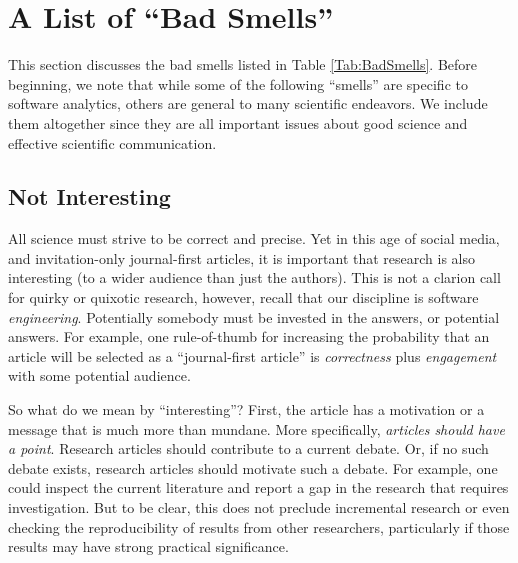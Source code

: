\documentclass[preprint,10pt]{elsarticle}
\begin{document}
 
\section{A List of ``Bad Smells''}\label{Sec:BadSmells}
This section discusses the bad smells listed in Table \ref{Tab:BadSmells}.
Before beginning, we note that while some of the following ``smells'' are specific to software analytics, others are general to many scientific endeavors.  We include them altogether since they are all important issues about good science and effective scientific communication.


\subsection{Not Interesting}

All science must strive to be correct and precise. Yet in this age of social media, and invitation-only journal-first articles, it is important that research is also interesting (to a wider audience than just the authors).  This is not a clarion call for quirky or quixotic research, however, recall that our discipline is software \textit{engineering}. Potentially somebody must be invested in the answers, or potential answers.  For example, one rule-of-thumb for increasing the probability that an article will be selected as a ``journal-first article'' is {\em correctness} plus {\em engagement} with some potential audience. 



So what do we mean by ``interesting''?  First, the article has a motivation or a message that is much more than mundane.  More specifically, {\em articles should have a point}. Research articles should contribute to a current debate. Or, if no such debate exists, research articles should motivate such a debate.  For example, one could inspect the current literature and report a gap in the research that requires investigation.  But to be clear, this does not preclude incremental research or even checking the reproducibility of results from other researchers, particularly if those results may have strong practical significance.
\end{document}
